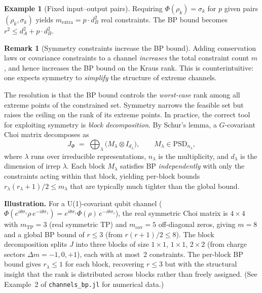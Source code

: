 \documentclass[11pt,a4paper]{article}
\theoremstyle{definition}
\newtheorem{remark}[theorem]{Remark}
\newtheorem{example}[theorem]{Example}
\newcommand{\PSD}{\mathrm{PSD}}
\begin{document}
\begin{example}[Fixed input--output pairs]
Requiring $\Phi(\rho_k) = \sigma_k$ for $p$ given pairs $(\rho_k, \sigma_k)$
yields $m_{\mathrm{extra}} = p \cdot d_B^2$ real constraints.  The BP bound
becomes $r^2 \leq d_A^2 + p \cdot d_B^2$.
\end{example}

\begin{remark}[Symmetry constraints increase the BP bound]
\label{rmk:constraints-increase}
Adding conservation laws or covariance constraints to a channel
\emph{increases} the total constraint count $m$, and hence
increases the BP bound on the Kraus rank.  This is
counterintuitive: one expects symmetry to \emph{simplify}
the structure of extreme channels.

The resolution is that the BP bound controls the \emph{worst-case}
rank among all extreme points of the constrained set.  Symmetry
narrows the feasible set but raises the ceiling on the rank of
its extreme points.  In practice, the correct tool for exploiting
symmetry is \emph{block decomposition}.  By Schur's lemma, a
$G$-covariant Choi matrix decomposes as
\[
  J_\Phi \;=\; \bigoplus_\lambda
  \bigl(M_\lambda \otimes I_{d_\lambda}\bigr),
  \qquad M_\lambda \in \PSD_{n_\lambda},
\]
where $\lambda$ runs over irreducible representations, $n_\lambda$
is the multiplicity, and $d_\lambda$ is the dimension of irrep
$\lambda$.  Each block $M_\lambda$ satisfies BP
\emph{independently} with only the constraints acting within that
block, yielding per-block bounds
$r_\lambda(r_\lambda{+}1)/2 \leq m_\lambda$ that are typically
much tighter than the global bound.

\smallskip
\noindent\textbf{Illustration.}  For a U(1)-covariant qubit channel
($\Phi(e^{i\theta\sigma_z}\rho\, e^{-i\theta\sigma_z})
= e^{i\theta\sigma_z}\Phi(\rho)\,e^{-i\theta\sigma_z}$), the real
symmetric Choi matrix is $4 \times 4$ with $m_{\mathrm{TP}} = 3$
(real symmetric TP) and $m_{\mathrm{cov}} = 5$ off-diagonal zeros,
giving $m = 8$ and a global BP bound of $r \leq 3$ (from
$r(r{+}1)/2 \leq 8$).  The block decomposition splits $J$ into
three blocks of size $1 \times 1$, $1 \times 1$, $2 \times 2$
(from charge sectors $\Delta m = -1, 0, +1$), each with at most~2
constraints.  The per-block BP bound gives $r_\lambda \leq 1$ for
each block, recovering $r \leq 3$ but with the structural insight
that the rank is distributed across blocks rather than freely
assigned.  (See Example~2 of \texttt{channels\_bp.jl} for
numerical data.)
\end{remark}
\end{document}
